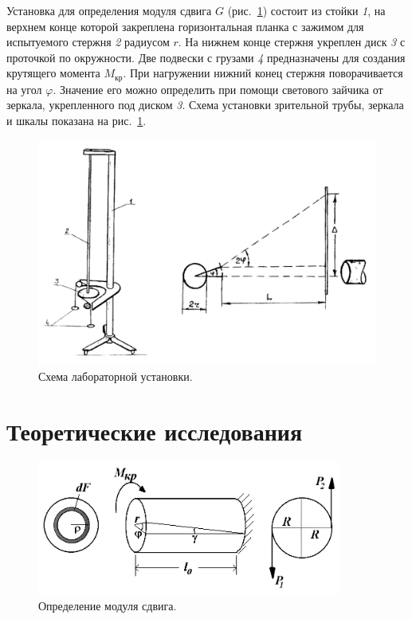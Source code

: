 \documentclass[12pt, a4paper]{article}
\begin{document}
    Установка для определения модуля сдвига $G$ (рис.~\ref{im1}) состоит из стойки \textit{1}, на верхнем конце которой закреплена горизонтальная планка с зажимом для испытуемого стержня \textit{2} радиусом $r$. На нижнем конце стержня укреплен диск \textit{3} с проточкой по окружности. Две подвески с грузами \textit{4} предназначены для создания крутящего момента $M_\text{кр}$. При нагружении нижний конец стержня поворачивается на угол $\varphi$. Значение его можно определить при помощи светового зайчика от зеркала, укрепленного под диском \textit{3}. Схема установки зрительной трубы, зеркала и шкалы показана на рис.~\ref{im1}.
    
    \begin{figure}[h]
        \centering
        \includegraphics[width = 16cm]{image_1.png}
        \caption{Схема лабораторной установки.}
        \label{im1}
    \end{figure}
    
    \newpage
    
    \section{Теоретические исследования}
    
    \begin{figure}[h]
        \centering
        \includegraphics[width = 10cm]{image_2.png}
        \caption{Определение модуля сдвига.}
        \label{im2}
    \end{figure}
    
\end{document}

